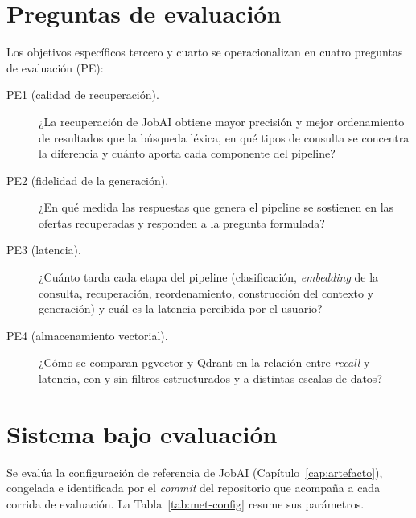 \section{Preguntas de evaluación}
\label{sec:met-preguntas}

Los objetivos específicos tercero y cuarto se operacionalizan en cuatro preguntas de evaluación (PE):

\begin{description}
    \item[PE1 (calidad de recuperación).] ¿La recuperación de JobAI obtiene mayor precisión y mejor ordenamiento de resultados que la búsqueda léxica, en qué tipos de consulta se concentra la diferencia y cuánto aporta cada componente del pipeline?
    \item[PE2 (fidelidad de la generación).] ¿En qué medida las respuestas que genera el pipeline se sostienen en las ofertas recuperadas y responden a la pregunta formulada?
    \item[PE3 (latencia).] ¿Cuánto tarda cada etapa del pipeline (clasificación, \textit{embedding} de la consulta, recuperación, reordenamiento, construcción del contexto y generación) y cuál es la latencia percibida por el usuario?
    \item[PE4 (almacenamiento vectorial).] ¿Cómo se comparan pgvector y Qdrant en la relación entre \textit{recall} y latencia, con y sin filtros estructurados y a distintas escalas de datos?
\end{description}

\section{Sistema bajo evaluación}
\label{sec:met-sistema}

Se evalúa la configuración de referencia de JobAI (Capítulo~\ref{cap:artefacto}), congelada e identificada por el \textit{commit} del repositorio que acompaña a cada corrida de evaluación. La Tabla~\ref{tab:met-config} resume sus parámetros.

